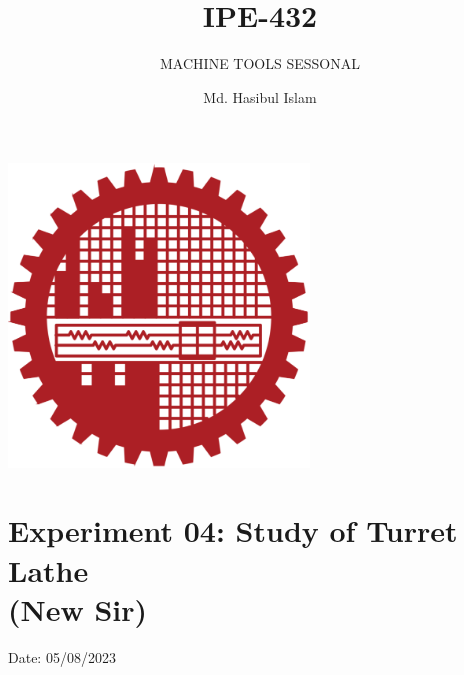 \documentclass{article}
\title{IPE-432}
\author{Md. Hasibul Islam}
\subtitle{MACHINE TOOLS SESSONAL}
\begin{document}
\begin{titlepage}
    \centering
    
    {\Huge\bfseries\maketitle}
    \vspace{2cm}
    \includegraphics[width=8cm]{institution_logo.jpg}
    \vfill
    \vspace*{2cm}
\end{titlepage}

\tableofcontents 
\hrulefill

\section{Experiment 04: Study of Turret Lathe\\ (New Sir)} 
\hfill Date: 05/08/2023
\end{document}
